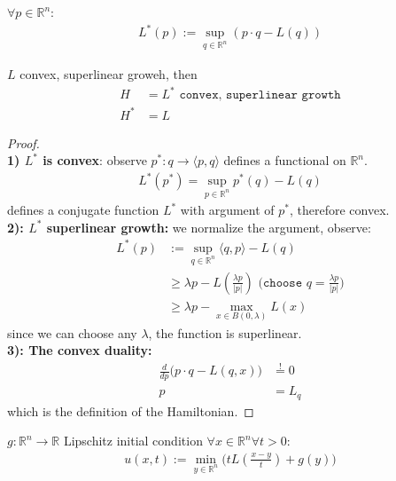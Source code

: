 \begin{definition}
	$\forall p \in \mathbb{R}^n$:
	\begin{align*}
		L^*(p):= \sup_{q \in \mathbb{R}^n} (p\cdot q - L(q))
	\end{align*}
\end{definition}

\begin{theorem}
	$L$ convex, superlinear groweh, then
	\begin{align*}
		H&= L^* \texttt{ convex, superlinear growth}\\
		H^* &= L
	\end{align*}
\end{theorem}
\begin{proof}\quad\\
\textbf{1) $L^*$ is convex}: observe $p^*: q \rightarrow \langle p, q \rangle$ defines a functional on $\mathbb{R}^n$. 
\begin{align*}
	L^*(p^*) = \sup_{p \in \mathbb{R}^n} p^*(q) - L(q)
\end{align*}
	defines a conjugate function $L^*$ with argument of $p^*$, therefore convex. \\
\textbf{2): $L^*$ superlinear growth:} we normalize the argument, observe:
\begin{align*}
	L^*(p) &:= \sup_{q \in \mathbb{R}^n} \langle q, p \rangle - L(q)\\
	&\ge \lambda p - L(\frac{\lambda p}{|p|})   \texttt{ (choose $q = \frac{\lambda p}{|p|}$)}\\
	&\ge \lambda p - \max_{x \in B(0, \lambda)} L(x) 
\end{align*}
since we can choose any $\lambda$, the function is superlinear.\\
\textbf{3): The convex duality:} 
\begin{align*}
	\frac{d}{dp}\bigg( p \cdot q - L(q, x)\bigg) &\overset{!}{=} 0\\
	p &= L_q
\end{align*}
which is the definition of the Hamiltonian. 
\end{proof}

\begin{definition}
	$g: \mathbb{R}^n \rightarrow \mathbb{R}$ Lipschitz initial condition 
	$\forall x \in \mathbb{R}^n \forall t >  0$:
	\begin{align*}
		u(x, t):= \min_{y \in \mathbb{R}^n} \bigg(t L(\frac{x - y}{t}) + g(y)\bigg)
	\end{align*}
\end{definition}

